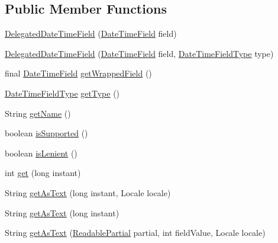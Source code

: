 \subsection*{Public Member Functions}
\begin{DoxyCompactItemize}
\item 
\hyperlink{classorg_1_1joda_1_1time_1_1field_1_1_delegated_date_time_field_a926016e7261d3214d26e833a4f4ef745}{Delegated\-Date\-Time\-Field} (\hyperlink{classorg_1_1joda_1_1time_1_1_date_time_field}{Date\-Time\-Field} field)
\item 
\hyperlink{classorg_1_1joda_1_1time_1_1field_1_1_delegated_date_time_field_a579e9f3917444be45beade1b9290f5f4}{Delegated\-Date\-Time\-Field} (\hyperlink{classorg_1_1joda_1_1time_1_1_date_time_field}{Date\-Time\-Field} field, \hyperlink{classorg_1_1joda_1_1time_1_1_date_time_field_type}{Date\-Time\-Field\-Type} type)
\item 
final \hyperlink{classorg_1_1joda_1_1time_1_1_date_time_field}{Date\-Time\-Field} \hyperlink{classorg_1_1joda_1_1time_1_1field_1_1_delegated_date_time_field_ab8de8075315c3ac9c100e94a5c8431c3}{get\-Wrapped\-Field} ()
\item 
\hyperlink{classorg_1_1joda_1_1time_1_1_date_time_field_type}{Date\-Time\-Field\-Type} \hyperlink{classorg_1_1joda_1_1time_1_1field_1_1_delegated_date_time_field_a6bb99dbc5864b838a4e41688af0ab36d}{get\-Type} ()
\item 
String \hyperlink{classorg_1_1joda_1_1time_1_1field_1_1_delegated_date_time_field_afdfb6a1e3235b6642ad5618e0d2e67c4}{get\-Name} ()
\item 
boolean \hyperlink{classorg_1_1joda_1_1time_1_1field_1_1_delegated_date_time_field_abd8cce445205fe50d224e4ba9ad0c9db}{is\-Supported} ()
\item 
boolean \hyperlink{classorg_1_1joda_1_1time_1_1field_1_1_delegated_date_time_field_abaf654f32bd4db1730dfcd4351cb2d4b}{is\-Lenient} ()
\item 
int \hyperlink{classorg_1_1joda_1_1time_1_1field_1_1_delegated_date_time_field_ae90a3343fe55e720e8a9677c71c7fd83}{get} (long instant)
\item 
String \hyperlink{classorg_1_1joda_1_1time_1_1field_1_1_delegated_date_time_field_ac491c0741f23eaf5ea1996dca6d06bcf}{get\-As\-Text} (long instant, Locale locale)
\item 
String \hyperlink{classorg_1_1joda_1_1time_1_1field_1_1_delegated_date_time_field_a6c466aeee1c21853a45ca05ed3094374}{get\-As\-Text} (long instant)
\item 
String \hyperlink{classorg_1_1joda_1_1time_1_1field_1_1_delegated_date_time_field_af364e0d239a5c918e0bb470cbfe41c0a}{get\-As\-Text} (\hyperlink{interfaceorg_1_1joda_1_1time_1_1_readable_partial}{Readable\-Partial} partial, int field\-Value, Locale locale)

\end{DoxyCompactItemize}
